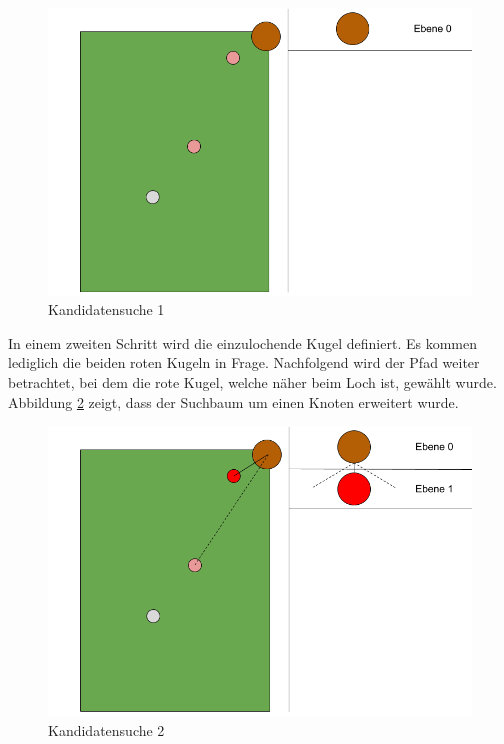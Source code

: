 \begin{figure}[h!]
    \begin{center}
        \includegraphics[width=0.5\linewidth]{../common/03_billiard_ai/resources/11_backwardsearch_1.png}
    \end{center}
    \caption{Kandidatensuche 1}
    \label{fig:backwardsearch_1}
\end{figure}

In einem zweiten Schritt wird die einzulochende Kugel definiert. Es kommen lediglich die beiden roten Kugeln in Frage.
Nachfolgend wird der Pfad weiter betrachtet, bei dem die rote Kugel, welche näher beim Loch ist, gewählt wurde.
Abbildung \ref{fig:backwardsearch_2} zeigt, dass der Suchbaum um einen Knoten erweitert wurde.
\begin{figure}[h!]
    \begin{center}
        \includegraphics[width=0.5\linewidth]{../common/03_billiard_ai/resources/12_backwardsearch_2.png}
    \end{center}
    \caption{Kandidatensuche 2}
    \label{fig:backwardsearch_2}
\end{figure}

